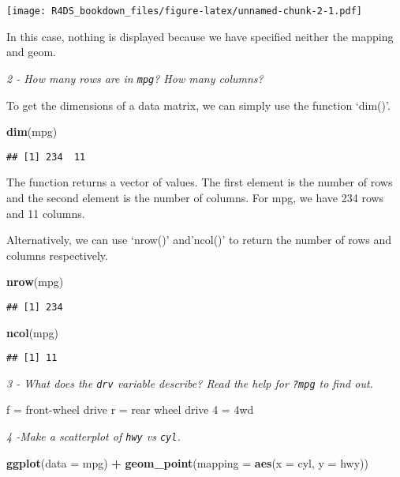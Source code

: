 \documentclass[]{article}
\newenvironment{Shaded}{\begin{snugshade}}{\end{snugshade}}
\newcommand{\KeywordTok}[1]{\textcolor[rgb]{0.13,0.29,0.53}{\textbf{#1}}}
\newcommand{\DataTypeTok}[1]{\textcolor[rgb]{0.13,0.29,0.53}{#1}}
\newcommand{\StringTok}[1]{\textcolor[rgb]{0.31,0.60,0.02}{#1}}
\newcommand{\OperatorTok}[1]{\textcolor[rgb]{0.81,0.36,0.00}{\textbf{#1}}}
\newcommand{\NormalTok}[1]{#1}
\theoremstyle{definition}
\theoremstyle{definition}
\theoremstyle{definition}
\theoremstyle{remark}
\begin{document}
\texttt{[image: R4DS\_bookdown\_files/figure-latex/unnamed-chunk-2-1.pdf]}

In this case, nothing is displayed because we have specified neither the
mapping and geom.

\emph{2 - How many rows are in \texttt{mpg}? How many columns?}

To get the dimensions of a data matrix, we can simply use the function
`dim()'.

\begin{Shaded}
\begin{Highlighting}[]
\KeywordTok{dim}\NormalTok{(mpg)}
\end{Highlighting}
\end{Shaded}

\begin{verbatim}
## [1] 234  11
\end{verbatim}

The function returns a vector of values. The first element is the number
of rows and the second element is the number of columns. For mpg, we
have 234 rows and 11 columns.

Alternatively, we can use `nrow()' and'ncol()' to return the number of
rows and columns respectively.

\begin{Shaded}
\begin{Highlighting}[]
\KeywordTok{nrow}\NormalTok{(mpg)}
\end{Highlighting}
\end{Shaded}

\begin{verbatim}
## [1] 234
\end{verbatim}

\begin{Shaded}
\begin{Highlighting}[]
\KeywordTok{ncol}\NormalTok{(mpg)}
\end{Highlighting}
\end{Shaded}

\begin{verbatim}
## [1] 11
\end{verbatim}

\emph{3 - What does the \texttt{drv} variable describe? Read the help
for \texttt{?mpg} to find out.}

f = front-wheel drive r = rear wheel drive 4 = 4wd

\emph{4 -Make a scatterplot of \texttt{hwy} vs \texttt{cyl}.}

\begin{Shaded}
\begin{Highlighting}[]
\KeywordTok{ggplot}\NormalTok{(}\DataTypeTok{data =}\NormalTok{ mpg) }\OperatorTok{+}
\StringTok{  }\KeywordTok{geom_point}\NormalTok{(}\DataTypeTok{mapping =} \KeywordTok{aes}\NormalTok{(}\DataTypeTok{x =}\NormalTok{ cyl, }\DataTypeTok{y =}\NormalTok{ hwy))}
\end{Highlighting}
\end{Shaded}
\end{document}
